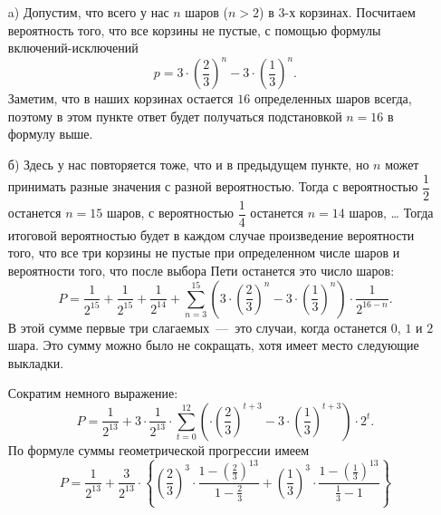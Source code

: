 \solutionSection

\begin{enumerate}

    \item[a)]  Допустим, что всего у нас $n$ шаров ($n > 2$) в $3$-х корзинах. Посчитаем вероятность того, что все корзины не пустые, 
	с помощью формулы включений-исключений
	$$p = 3 \cdot \left(\frac{2}{3}\right)^{n} - 3 \cdot \left(\frac{1}{3}\right)^{n}.$$
	Заметим, что в наших корзинах остается $16$ определенных шаров
	всегда, поэтому в этом пункте ответ будет получаться подстановкой
	$n = 16$ в формулу выше. 

	\item[б)] Здесь у нас повторяется тоже, что и в предыдущем пункте,
	но $n$ может принимать разные значения с разной вероятностью.
	Тогда с вероятностью $\dfrac{1}{2}$ останется $n = 15$ шаров,
	с вероятностью $\dfrac{1}{4}$ останется $n = 14$ шаров, \ldots
	Тогда итоговой вероятностью будет в каждом случае произведение
	вероятности того, что все три корзины не пустые при определенном
	числе шаров и вероятности того, что после выбора Пети останется
	это число шаров:
	$$P = \frac{1}{2^{15}} + \frac{1}{2^{15}} + \frac{1}{2^{14}} + 
	\sum\limits_{n=3}^{15} \left(3 \cdot \left(\frac{2}{3}\right)^{n} - 3 \cdot \left(\frac{1}{3}\right)^{n}\right) \cdot \frac{1}{2^{16-n}}.$$
	В этой сумме первые три слагаемых~---~это случаи, когда останется
	$0$, $1$ и $2$ шара. Это сумму можно было не сокращать, хотя имеет
	место следующие выкладки.
	
	Сократим немного выражение:
	$$P = \frac{1}{2^{13}} + 3 \cdot \frac{1}{2^{13}}
	\cdot \sum\limits_{t = 0}^{12}
	\left(\cdot \left(\frac{2}{3}\right)^{t+3} - 3 \cdot \left(\frac{1}{3}\right)^{t+3}\right) \cdot 2^{t}.$$
	По формуле суммы геометрической прогрессии имеем
	$$P = \frac{1}{2^{13}} + \frac{3}{2^{13}} \cdot\left\{ \left(\frac{2}{3}\right)^3 
	\cdot \frac{1 - \left(\frac{2}{3}\right)^{13}}{1 - \frac{2}{3}} + 
    \left(\frac{1}{3}\right)^3 \cdot \frac{1 - \left(\frac{1}{3}\right)^{13}}{\frac{1}{3} - 1}\right\}$$
    
\end{enumerate}	


\additionalCriteria

